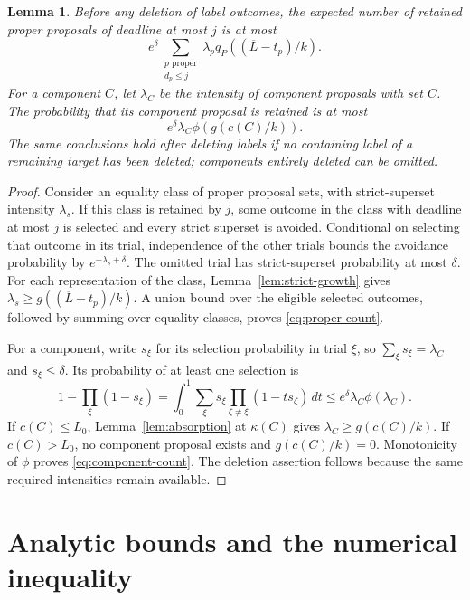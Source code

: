 \documentclass[11pt]{article}
\numberwithin{equation}{section}
\newtheorem{lemma}[theorem]{Lemma}
\theoremstyle{definition}
\newcommand{\cL}{\overline L}
\begin{document}
\begin{lemma}\label{lem:count-bounds}
Before any deletion of label outcomes, the expected number of retained
proper proposals of deadline at most $j$ is at most
\begin{equation}\label{eq:proper-count}
 e^\delta\sum_{\substack{p\text{ proper}\\d_p\le j}}
         \lambda_pq_P((\cL-t_p)/k).
\end{equation}
For a component $C$, let $\lambda_C$ be the intensity of component
proposals with set $C$. The probability that its component proposal is
retained is at most
\begin{equation}\label{eq:component-count}
 e^\delta\lambda_C\phi(g(c(C)/k)).
\end{equation}
The same conclusions hold after deleting labels if no containing label
of a remaining target has been deleted; components entirely deleted
can be omitted.
\end{lemma}
\begin{proof}
Consider an equality class of proper proposal sets, with strict-superset
intensity $\lambda_s$. If this class is retained by $j$, some outcome
in the class with deadline at most $j$ is selected and every strict
superset is avoided. Conditional on selecting that outcome in its trial,
independence of the other trials bounds the avoidance probability by
$e^{-\lambda_s+\delta}$. The omitted trial has strict-superset
probability at most $\delta$. For each representation of the class,
Lemma~\ref{lem:strict-growth} gives
$\lambda_s\ge g((\cL-t_p)/k)$. A union bound over the eligible selected
outcomes, followed by summing over equality classes, proves
\eqref{eq:proper-count}.

For a component, write $s_\xi$ for its selection probability in trial
$\xi$, so $\sum_\xi s_\xi=\lambda_C$ and $s_\xi\le\delta$.
Its probability of at least one selection is
\[
 1-\prod_\xi(1-s_\xi)
 =\int_0^1\sum_\xi s_\xi\prod_{\zeta\ne\xi}(1-t s_\zeta)\,dt
 \le e^\delta\lambda_C\phi(\lambda_C).
\]
If $c(C)\le L_0$, Lemma~\ref{lem:absorption} at $\kappa(C)$ gives
$\lambda_C\ge g(c(C)/k)$. If $c(C)>L_0$, no component proposal exists
and $g(c(C)/k)=0$. Monotonicity of $\phi$ proves
\eqref{eq:component-count}. The deletion assertion follows because the
same required intensities remain available.
\end{proof}



\section{Analytic bounds and the numerical inequality}\label{sec:analytic}
\end{document}
